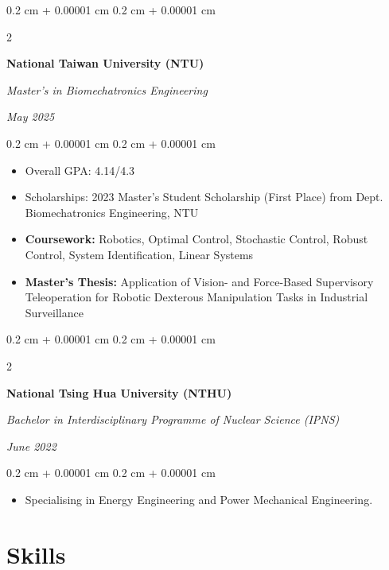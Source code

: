 \documentclass[10pt, letterpaper]{article}
\newenvironment{highlights}{
    \begin{itemize}[
        topsep=0.10 cm,
        parsep=0.10 cm,
        partopsep=0pt,
        itemsep=0pt,
        leftmargin=0.4 cm + 10pt
    ]
}{
    \end{itemize}
} %
\newenvironment{onecolentry}{
    \begin{adjustwidth}{
        0.2 cm + 0.00001 cm
    }{
        0.2 cm + 0.00001 cm
    }
}{
    \end{adjustwidth}
} %
\newenvironment{twocolentry}[2][]{
    \onecolentry
    \def\secondColumn{#2}
    \setcolumnwidth{\fill, 4.5 cm}
    \begin{paracol}{2}
}{
    \switchcolumn \raggedleft \secondColumn
    \end{paracol}
    \endonecolentry
} %
\begin{document}
        \begin{twocolentry}{
            
            
        \textit{May 2025}}
            \textbf{National Taiwan University (NTU)}

            \textit{Master's in Biomechatronics Engineering}
        \end{twocolentry}

        \vspace{0.10 cm}
        \begin{onecolentry}
            \begin{highlights}
                \item Overall GPA: 4.14/4.3
                \item Scholarships: 2023 Master's Student Scholarship (First Place) from Dept. Biomechatronics Engineering, NTU
                \item \textbf{Coursework:} Robotics, Optimal Control, Stochastic Control, Robust Control, System Identification, Linear Systems
                \item \textbf{Master's Thesis:} Application of Vision- and Force-Based Supervisory Teleoperation for Robotic Dexterous Manipulation Tasks in Industrial Surveillance
            \end{highlights}
        \end{onecolentry}

        \vspace{0.2 cm}

        \begin{twocolentry}{
            
        \textit{June 2022}}
            \textbf{National Tsing Hua University (NTHU)}
            
            \textit{Bachelor in Interdisciplinary Programme of Nuclear Science (IPNS)}
        \end{twocolentry}
        \vspace{0.10 cm}
        \begin{onecolentry}
            \begin{highlights}
                \item Specialising in Energy Engineering and Power Mechanical Engineering.
            \end{highlights}
        \end{onecolentry}

    \section{Skills}
\end{document}
